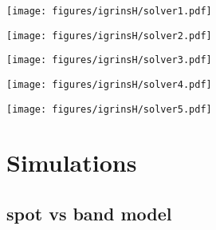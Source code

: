 \documentclass[twocolumn]{aastex631}
\begin{document}
\iftrue
\begin{figure*}
    \centering
    \begin{minipage}[b]{0.18\textwidth}
        \centering
        \texttt{[image: figures/igrinsH/solver1.pdf]}
        \label{fig:igrinsHsolver1}
     \end{minipage}
     \hfill
     \begin{minipage}[b]{0.18\textwidth}
         \centering
         \texttt{[image: figures/igrinsH/solver2.pdf]}
         \label{fig:igrinsHsolver2}
     \end{minipage}
     \hfill
     \begin{minipage}[b]{0.18\textwidth}
         \centering
         \texttt{[image: figures/igrinsH/solver3.pdf]}
         \label{fig:igrinsHsolver3}
     \end{minipage}
     \hfill
     \begin{minipage}[b]{0.18\textwidth}
         \centering
         \texttt{[image: figures/igrinsH/solver4.pdf]}
         \label{fig:igrinsHsolver4}
     \end{minipage}
     \hfill
     \begin{minipage}[b]{0.18\textwidth}
         \centering
         \texttt{[image: figures/igrinsH/solver5.pdf]}
         \label{fig:igrinsHsolver5}
     \end{minipage}
\end{figure*} 
\fi

\section{Simulations}

\subsection{spot vs band model}
\end{document}
